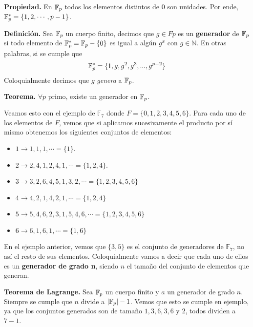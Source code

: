 \vspace{1em}
\textbf{Propiedad.} En $\mathbb{F}_p$ todos los elementos distintos de $0$ son unidades. Por ende, $\mathbb{F}_p^*=\{1,2,\cdots, p-1\}$.

\vspace{1em}

\textbf{Definición.} Sea $\mathbb{F}_p$ un cuerpo finito, decimos que $g \in Fp$ es un \textbf{generador} de $\mathbb{F}_p$ si todo elemento de $\mathbb{F}_p^* = \mathbb{F}_p - \{0\}$ es igual a algún $g^x$ con $g \in \mathbb{N}$. En otras palabras, si se cumple que $$\mathbb{F}_p^* = \{1, g, g^2, g^3, ..., g^{p-2}\}$$ Coloquialmente decimos que $g$ \textit{genera} a $\mathbb{F}_p$.

\vspace{1em}

\textbf{Teorema.} $\forall p$ primo, existe un generador en $\mathbb{F}_p$.

\vspace{1em}

Veamos esto con el ejemplo de $\mathbb{F}_7$ donde $F = \{0,1,2,3,4,5,6\}$. Para cada uno de los elementos de $F$, vemos que si aplicamos sucesivamente el producto por sí mismo obtenemos los siguientes conjuntos de elementos:
\begin{itemize}
    \item $1 \rightarrow 1,1,1,\cdots = \{1\}$.
    \item $2 \rightarrow 2,4,1,2,4,1,\cdots = \{1,2,4\}$.
    \item $3 \rightarrow 3,2,6,4,5,1,3,2,\cdots= \{1,2,3,4,5,6\}$
    \item $4 \rightarrow 4,2,1,4,2,1,\cdots= \{1,2,4\}$
    \item $5 \rightarrow 5,4,6,2,3,1,5,4,6,\cdots= \{1,2,3,4,5,6\}$
    \item $6 \rightarrow 6,1,6,1,\cdots= \{1,6\}$
\end{itemize}

\vspace{1em}

En el ejemplo anterior, vemos que $\{3,5\}$ es el conjunto de generadores de $\mathbb{F}_7$, no así el resto de sus elementos. Coloquialmente vamos a decir que cada uno de ellos es un \textbf{generador de grado n}, siendo $n$ el tamaño del conjunto de elementos que generan. 

\vspace{1em}

\textbf{Teorema de Lagrange.} Sea $\mathbb{F}_p$ un cuerpo finito y $a$ un generador de grado $n$. Siempre se cumple que $n$ divide a $|\mathbb{F}_p|-1$. Vemos que esto se cumple en ejemplo, ya que los conjuntos generados son de tamaño $1,3,6,3,6 \text{ y } 2$, todos dividen a $7-1$.

